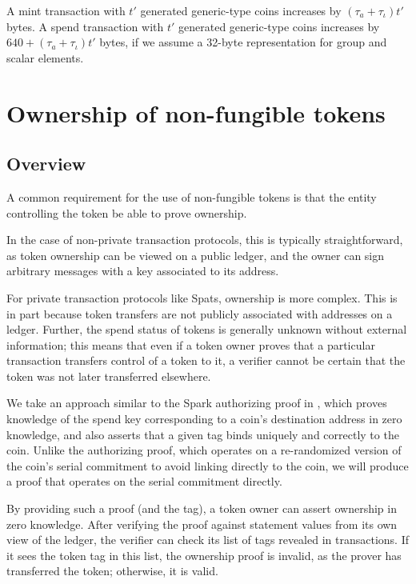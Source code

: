 \documentclass{article}
\begin{document}
A mint transaction with $t'$ generated generic-type coins increases by $(\tau_a + \tau_\iota) t'$ bytes.
A spend transaction with $t'$ generated generic-type coins increases by $640 + (\tau_a + \tau_\iota) t'$ bytes, if we assume a 32-byte representation for group and scalar elements.


\section{Ownership of non-fungible tokens}


\subsection{Overview}

A common requirement for the use of non-fungible tokens is that the entity controlling the token be able to prove ownership.

In the case of non-private transaction protocols, this is typically straightforward, as token ownership can be viewed on a public ledger, and the owner can sign arbitrary messages with a key associated to its address.

For private transaction protocols like Spats, ownership is more complex.
This is in part because token transfers are not publicly associated with addresses on a ledger.
Further, the spend status of tokens is generally unknown without external information; this means that even if a token owner proves that a particular transaction transfers control of a token to it, a verifier cannot be certain that the token was not later transferred elsewhere.

We take an approach similar to the Spark authorizing proof in \cite{spark}, which proves knowledge of the spend key corresponding to a coin's destination address in zero knowledge, and also asserts that a given tag binds uniquely and correctly to the coin.
Unlike the authorizing proof, which operates on a re-randomized version of the coin's serial commitment to avoid linking directly to the coin, we will produce a proof that operates on the serial commitment directly.

By providing such a proof (and the tag), a token owner can assert ownership in zero knowledge.
After verifying the proof against statement values from its own view of the ledger, the verifier can check its list of tags revealed in transactions.
If it sees the token tag in this list, the ownership proof is invalid, as the prover has transferred the token; otherwise, it is valid.
\end{document}
